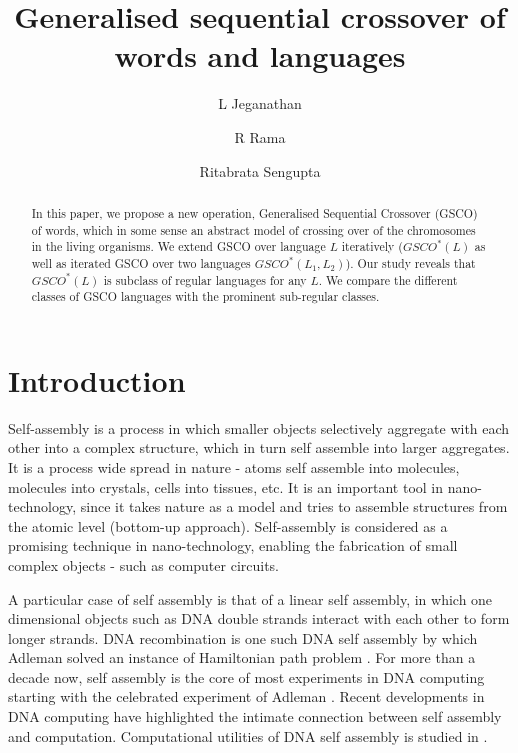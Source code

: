 \documentclass{llncs}
\begin{document}
\title{ Generalised sequential crossover of words and languages}
\author{L Jeganathan \and R Rama \and Ritabrata Sengupta}
\maketitle
\begin{abstract}
In this paper, we propose a new operation, Generalised Sequential
Crossover (GSCO) of words, which in some sense an abstract model of
crossing over of the chromosomes  in the living organisms. We extend
GSCO over language $L$ iteratively ($GSCO^*(L)$ as well as iterated
GSCO over two languages $GSCO^*(L_1,L_2)$). Our study reveals that
$GSCO^*(L)$ is subclass of regular languages for any $L$. We compare
the different classes of GSCO languages with the prominent
sub-regular classes. \end{abstract}
\section{Introduction}

\par Self-assembly is a process in which smaller objects selectively
aggregate with each other into a complex structure, which in turn
self assemble into larger aggregates. It is a process wide spread in
nature - atoms self assemble into molecules, molecules into
crystals, cells into
 tissues, etc. It is an important tool  in nano-technology, since it takes
 nature as a model and tries to assemble structures from the atomic level
 (bottom-up approach). Self-assembly is considered as a promising technique
 in nano-technology, enabling the fabrication of small complex objects - such
 as computer circuits.

\par A particular case of self assembly is that of a linear self assembly,
 in which one dimensional objects such as DNA double strands interact with
  each other to form  longer strands. DNA recombination is  one such DNA
   self assembly by which Adleman solved an instance of Hamiltonian path
   problem \cite{Ad}. For more than a decade now, self assembly is the
   core of most experiments in DNA computing starting with the celebrated
   experiment of Adleman \cite{Ad,FCL,OK}. Recent developments in DNA computing
    have highlighted the intimate connection between self assembly and computation.
     Computational utilities of DNA self  assembly is studied in \cite{Win}.
\end{document}
